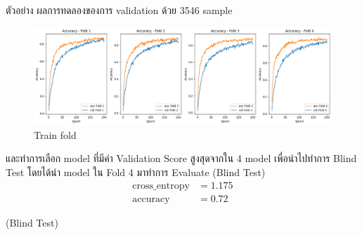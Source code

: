 ตัวอย่าง ผลการทดลองของการ validation ด้วย 3546 sample
\begin{figure}[h]
  \begin{center}
  
  \includegraphics[scale=0.4]{pic/model/train_fold.png}
  \end{center}
  
  \caption[Train fold]{Train fold}
  \label{fig:Train fold}
  \end{figure}


  และทำการเลือก model ที่มีค่า Validation Score สูงสุดจากใน 4 model  
  เพื่อนำไปทำการ Blind Test 
  โดยได้นำ model ใน  Fold 4   มาทำการ
  Evaluate (Blind Test)
  \begin{align}
    \text{cross\_entropy} &= 1.175 \\
    \text{accuracy} &= 0.72
  \end{align}
 

  (Blind Test)

